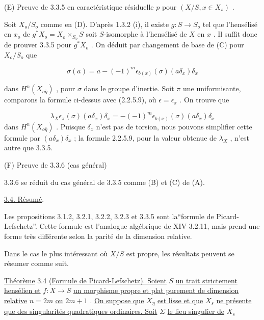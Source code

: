 (E) Preuve de 3.3.5 en caractéristique résiduelle $p$ pour $(X/S, x \in X_s)$ .

Soit $X_o/S_o$ comme en (D). D'après 1.3.2 (i), il existe $g : S \to S_o$ tel que l'hensélisé en $x_o$ de $g^{*}X_o = X_o \times_{S_o} S$ soit $S$-isomorphe à l'hensélisé de $X$ en $x$ . Il suffit donc de prouver 3.3.5 pour $g^{*}X_o$ . On déduit par changement de base de (C) pour $X_o/S_o$ que

\begin{equation*}
\sigma(a) = a - (-1)^m \epsilon_{b(x)}(\sigma)(a\delta_x)\delta_x 
\end{equation*}


 dans $H^n(X_{o\bar{\eta}})$ , pour $\sigma$ dans le groupe d'inertie. Soit $\pi$ une uniformisante, comparons la formule ci-dessus avec (2.2.5.9), où $\epsilon = \epsilon_{\pi}$ . On trouve que

\begin{equation*}
\lambda_X \epsilon_{\pi}(\sigma)(a\delta_x)\delta_x = - (-1)^m \epsilon_{b(x)}(\sigma)(a\delta_x)\delta_x
\end{equation*}
dans $H^n(X_{o\bar{\eta}})$ . Puisque $\delta_x$ n'est pas de torsion, nous pouvons simplifier cette formule par $(a\delta_x)\delta_x$ ; la formule 2.2.5.9, pour la valeur obtenue de $\lambda_X$ , n'est autre que 3.3.5.

(F) Preuve de 3.3.6 (cas général)

3.3.6 se réduit du cas général de 3.3.5 comme (B) et (C) de (A).


\underline{3.4. \quad Résumé}.

Les propositions 3.1.2, 3.2.1, 3.2.2, 3.2.3 et 3.3.5 sont la``formule de Picard-Lefschetz''. Cette formule est l'analogue algébrique de XIV 3.2.11, mais prend une forme très différente selon la parité de la dimension relative.

Dans le cas le plus intéressant où $X/S$ est propre, les résultats peuvent se résumer comme suit.

\underline{Théorème} 3.4 \underline{(Formule de Picard-Lefschetz). Soient} $S$ \underline{un trait strictement hensélien et} $f : X \to S$ \underline{un morphisme propre et plat purement de dimension relative} $n = 2m$ \underline{ou} $2m + 1$ . \underline{On suppose que} $X_{\eta}$ \underline{est lisse et que} $X_s$ \underline{ne présente que des singularités quadratiques ordinaires. Soit} $\Sigma$ \underline{le lieu singulier de} $X_s$

